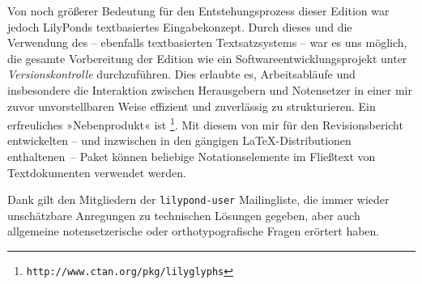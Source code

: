 \documentclass[12pt]{scrartcl}
\begin{document}
Von noch größerer Bedeutung für den Entstehungsprozess dieser Edition war jedoch LilyPonds textbasiertes Eingabekonzept.
Durch dieses und die Verwendung des -- ebenfalls textbasierten Textsatzsystems  -- war es uns möglich, die gesamte Vorbereitung der Edition wie ein Softwareentwicklungsprojekt unter \emph{Versionskontrolle} durchzuführen.
Dies erlaubte es, Arbeitsabläufe und insbesondere die Interaktion zwischen Herausgebern und Notensetzer in einer mir zuvor unvorstellbaren Weise effizient und zuverlässig zu strukturieren.
Ein erfreuliches »Nebenprodukt« ist \lilyglyphs{}%
\footnote{\texttt{http://www.ctan.org/pkg/lilyglyphs}}.
Mit diesem von mir für den Revisionsbericht entwickelten -- und inzwischen in den gängigen \LaTeX-Distributionen enthalte\mbox{nen --} Paket können beliebige Notationselemente im Fließtext von Textdokumenten verwendet werden.

Dank gilt den Mitgliedern der \texttt{lilypond-user} Mailingliste, die immer wieder unschätzbare Anregungen zu technischen Lösungen gegeben, aber auch allgemeine notensetzerische oder orthotypografische Fragen erörtert haben.
\end{document}
